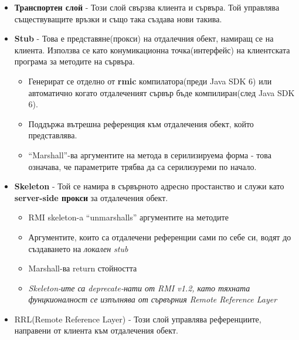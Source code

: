 \documentclass[11pt]{article} %
\begin{document}
\begin{itemize}[noitemsep]
	\item \textbf{Транспортен слой} - Този слой свързва клиента и сървъра. Той управлява съществуващите връзки и също така създава нови такива.
	\item \textbf{Stub} - Това е представяне(прокси) на отдалечния обект, намиращ се на клиента. Използва се като конумикационна точка(интерфейс) на клиентската програма за методите на сървъра.
	\begin{itemize}[noitemsep]
		\item Генерират се отделно от \textbf{rmic} компилатора(преди Java SDK 6) или автоматично когато отдалеченият сървър бъде компилиран(след Java SDK 6).
		\item Поддържа вътрешна референция към отдалечения обект, който представлява.
		\item \enquote{Marshall}-ва аргументите на метода в серилизируема форма - това означава, че параметрите трябва да са серилизуреми по начало.
	\end{itemize}	  
	\item \textbf{Skeleton} - Той се намира в сървърното адресно простанство и служи като \textbf{server-side прокси} за отдалечения обект. 
	\begin{itemize}[noitemsep]
		\item RMI skeleton-a \enquote{unmarshalls} аргументите на методите
		\item Аргументите, които са отдалечени референции сами по себе си, водят до създаването на \textit{локален stub}
		\item Marshall-ва return стойността
		\item \textit{Skeleton-ите са deprecate-нати от RMI v1.2, като тяхната фунцкионалност се изпълнява от сървърния Remote Reference Layer}
	\end{itemize}
	\item RRL(Remote Reference Layer) - Този слой управлява референциите, направени от клиента към отдалечения обект.
\end{itemize}
\end{document}
